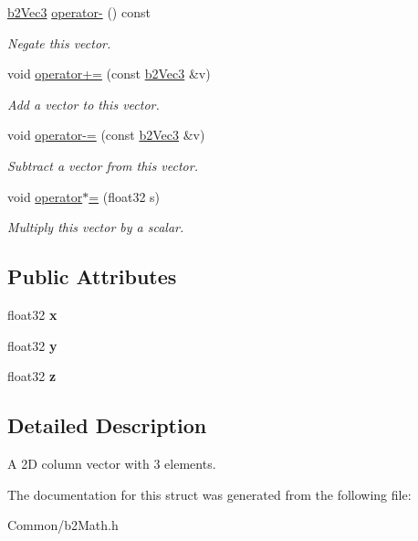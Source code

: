 \begin{DoxyCompactItemize}
\mbox{\label{structb2Vec3_a396e2b5b3c53a502859ff80544c27db8}} 
\mbox{\hyperlink{structb2Vec3}{b2\+Vec3}} \mbox{\hyperlink{structb2Vec3_a396e2b5b3c53a502859ff80544c27db8}{operator-\/}} () const
\begin{DoxyCompactList}\small\item\em Negate this vector. \end{DoxyCompactList}\item 
\mbox{\label{structb2Vec3_a2aaeed3f5308aad85d19c5f0efc72641}} 
void \mbox{\hyperlink{structb2Vec3_a2aaeed3f5308aad85d19c5f0efc72641}{operator+=}} (const \mbox{\hyperlink{structb2Vec3}{b2\+Vec3}} \&v)
\begin{DoxyCompactList}\small\item\em Add a vector to this vector. \end{DoxyCompactList}\item 
\mbox{\label{structb2Vec3_a9e5b535548e1c5dfc0dc258d08f5ca32}} 
void \mbox{\hyperlink{structb2Vec3_a9e5b535548e1c5dfc0dc258d08f5ca32}{operator-\/=}} (const \mbox{\hyperlink{structb2Vec3}{b2\+Vec3}} \&v)
\begin{DoxyCompactList}\small\item\em Subtract a vector from this vector. \end{DoxyCompactList}\item 
\mbox{\label{structb2Vec3_aaa9aa20195cd0ee53c7176a9a9b02389}} 
void \mbox{\hyperlink{structb2Vec3_aaa9aa20195cd0ee53c7176a9a9b02389}{operator$\ast$=}} (float32 s)
\begin{DoxyCompactList}\small\item\em Multiply this vector by a scalar. \end{DoxyCompactList}\end{DoxyCompactItemize}
\subsection*{Public Attributes}
\begin{DoxyCompactItemize}
\item 
\mbox{\label{structb2Vec3_aedc5e37849caa413a8e767fc47741db2}} 
float32 {\bfseries x}
\item 
\mbox{\label{structb2Vec3_af5a7e99d13d02ff9abb323838d44d3b1}} 
float32 {\bfseries y}
\item 
\mbox{\label{structb2Vec3_a7cb88968ff10fa500df0b10f5c425536}} 
float32 {\bfseries z}
\end{DoxyCompactItemize}


\subsection{Detailed Description}
A 2D column vector with 3 elements. 

The documentation for this struct was generated from the following file\+:\begin{DoxyCompactItemize}
\item 
Common/b2\+Math.\+h\end{DoxyCompactItemize}
